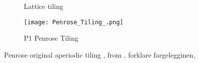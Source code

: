 


\begin{figure}[h!]%
    \centering
    \begin{subfigure}{.47\textwidth}
        \centering
        \caption{Lattice tiling}
        \label{fig:tiling_one}
    \end{subfigure}\quad
    \begin{subfigure}{.47\textwidth}
        \centering
        \texttt{[image: Penrose\_Tiling\_.png]}
        \caption{P1 Penrose Tiling}
        \label{fig:tiling_two}
    \end{subfigure}
    \caption{Penrose original aperiodic tiling \cite{penrosePentaplexityClassNonPeriodic1979}, from \cite{inductiveloadP1TilingUsing}, forklare fargelegginen, }
    \label{fig:tilingsss}
\end{figure}
